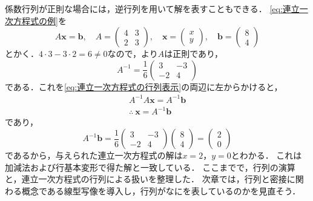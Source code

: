 係数行列が正則な場合には，逆行列を用いて解を表すこともできる．
\eqref{eq:連立一次方程式の例}を
\begin{equation}
  A\bm{x} = \bm{b}, \quad
  A = \begin{pmatrix} 4 & 3 \\ 2 & 3 \end{pmatrix}, \quad
  \bm{x} = \begin{pmatrix} x \\ y \end{pmatrix}, \quad
  \bm{b} = \begin{pmatrix} 8 \\ 4 \end{pmatrix} \label{eq:連立一次方程式の行列表示}
\end{equation}
とかく．$4 \cdot 3 - 3 \cdot 2 = 6 \ne 0$なので，より$A$は正則であり，
\[
  A^{-1} = \frac{1}{6} \begin{pmatrix} 3 & -3 \\ -2 & 4 \end{pmatrix}
\]
である．これを\eqref{eq:連立一次方程式の行列表示}の両辺に左からかけると，
\begin{gather*}
  A^{-1}A\bm{x} = A^{-1}\bm{b} \\
  \therefore~ \bm{x} = A^{-1}\bm{b}
\end{gather*}
であり，
\[
  A^{-1}\bm{b} = \frac{1}{6}
  \begin{pmatrix} 3 & -3 \\ -2 & 4 \end{pmatrix}
  \begin{pmatrix} 8 \\ 4 \end{pmatrix}
  =
  \begin{pmatrix} 2 \\ 0 \end{pmatrix}
\]
であるから，与えられた連立一次方程式の解は$x = 2$，$y = 0$とわかる．
これは加減法および行基本変形で得た解と一致している．
ここまでで，行列の演算と，連立一次方程式の行列による扱いを整理した．
次章では，行列と密接に関わる概念である線型写像を導入し，行列がなにを表しているのかを見直そう．
